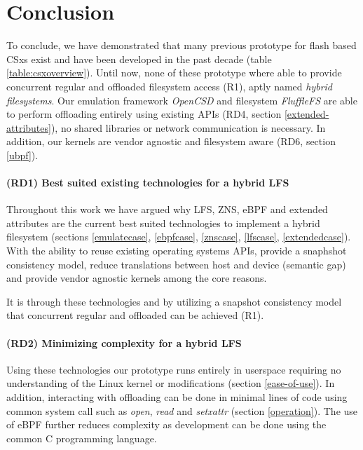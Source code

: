 \chapter{Conclusion}

To conclude, we have demonstrated that many previous prototype for flash based
CSxs exist and have been developed in the past decade
(table \ref{table:csxoverview}). Until now, none of these prototype where able
to provide concurrent regular and offloaded filesystem access (R1), aptly named
\textit{hybrid filesystems}. Our emulation framework \textit{OpenCSD} and
filesystem \textit{FluffleFS} are able to perform offloading entirely using
existing APIs (RD4, section \ref{extended-attributes}), no shared libraries or
network communication is necessary. In addition, our kernels are vendor
agnostic and filesystem aware (RD6, section \ref{ubpf}).

\subsubsection*{(RD1) Best suited existing technologies for a hybrid LFS}

Throughout this work we have argued why LFS, ZNS, eBPF and extended attributes
are the current best suited technologies to implement a hybrid filesystem
(sections \ref{emulatecase}, \ref{ebpfcase}, \ref{znscase}, \ref{lfscase},
\ref{extendedcase}). With the ability to reuse existing operating systems APIs,
provide a snaphshot consistency model, reduce translations between host and
device (semantic gap) and provide vendor agnostic kernels among the core
reasons.

It is through these technologies and by utilizing a snapshot
consistency model that concurrent regular and offloaded can be achieved (R1).

\subsubsection*{(RD2) Minimizing complexity for a hybrid LFS}

Using these technologies our prototype runs entirely in userspace requiring no
understanding of the Linux kernel or modifications (section \ref{ease-of-use}).
In addition, interacting with offloading can be done in minimal lines of code
using common system call such as \textit{open}, \textit{read} and
\textit{setxattr} (section \ref{operation}). The use of eBPF further reduces
complexity as development can be done using the common C programming
language.

